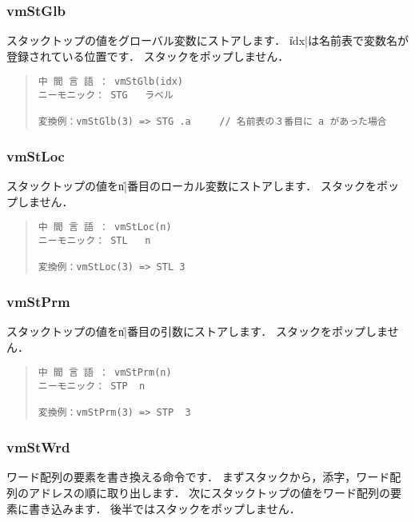 \subsubsection{vmStGlb}

スタックトップの値をグローバル変数にストアします．
\|idx|は名前表で変数名が登録されている位置です．
スタックをポップしません．

\begin{quote}
\begin{verbatim}
中 間 言 語 ： vmStGlb(idx)
ニーモニック： STG   ラベル

変換例：vmStGlb(3) => STG .a     // 名前表の３番目に a があった場合
\end{verbatim}
\end{quote}

\subsubsection{vmStLoc}

スタックトップの値を\|n|番目のローカル変数にストアします．
スタックをポップしません．

\begin{quote}
\begin{verbatim}
中 間 言 語 ： vmStLoc(n)
ニーモニック： STL   n

変換例：vmStLoc(3) => STL 3
\end{verbatim}
\end{quote}

\subsubsection{vmStPrm}

スタックトップの値を\|n|番目の引数にストアします．
スタックをポップしません．

\begin{quote}
\begin{verbatim}
中 間 言 語 ： vmStPrm(n)
ニーモニック： STP  n   

変換例：vmStPrm(3) => STP  3
\end{verbatim}
\end{quote}

\subsubsection{vmStWrd}

ワード配列の要素を書き換える命令です．
まずスタックから，添字，ワード配列のアドレスの順に取り出します．
次にスタックトップの値をワード配列の要素に書き込みます．
後半ではスタックをポップしません．

